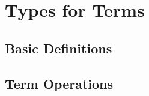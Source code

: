 \section{Types for Terms}\label{sec:types-terms}
\subsection{Basic Definitions}\label{sec:types-basic-defs}\firstsentence{\ualibTermsBasic}{\urlTermsBasic}

\subsection{Term Operations}\label{sec:term-operations}\firstsentence{\ualibOperations}{\urlOperations}

